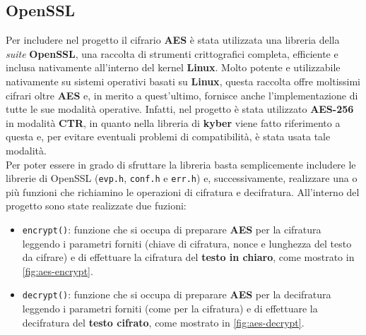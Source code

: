 \subsection{OpenSSL}
Per includere nel progetto il cifrario \textbf{AES} è stata utilizzata una libreria della \emph{suite} \textbf{OpenSSL}, una raccolta di strumenti crittografici completa, efficiente e inclusa nativamente all'interno del kernel \textbf{Linux}. Molto potente e utilizzabile nativamente su sistemi operativi basati su \textbf{Linux}, questa raccolta offre moltissimi cifrari oltre \textbf{AES} e, in merito a quest'ultimo, fornisce anche l'implementazione di tutte le sue modalità operative. Infatti, nel progetto è stata utilizzato \textbf{AES-256} in modalità \textbf{CTR}, in quanto nella libreria di \textbf{kyber} viene fatto riferimento a questa e, per evitare eventuali problemi di compatibilità, è stata usata tale modalità.\\
Per poter essere in grado di sfruttare la libreria basta semplicemente includere le librerie di OpenSSL (\texttt{evp.h}, \texttt{conf.h} e \texttt{err.h}) e, successivamente, realizzare una o più funzioni che richiamino le operazioni di cifratura e decifratura. All'interno del progetto sono state realizzate due fuzioni:
\begin{itemize}
    \item \texttt{encrypt()}: funzione che si occupa di preparare \textbf{AES} per la cifratura leggendo i parametri forniti (chiave di cifratura, nonce e lunghezza del testo da cifrare) e di effettuare la cifratura del \textbf{testo in chiaro}, come mostrato in \autoref{fig:aes-encrypt}.
    \item \texttt{decrypt()}: funzione che si occupa di preparare \textbf{AES} per la decifratura leggendo i parametri forniti (come per la cifratura) e di effettuare la decifratura del \textbf{testo cifrato}, come mostrato in \autoref{fig:aes-decrypt}.
\end{itemize}

